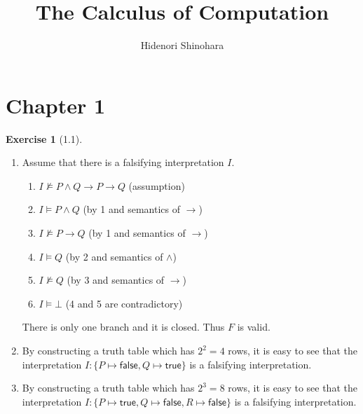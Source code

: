 \documentclass[12pt, psamsfonts]{amsart}
\theoremstyle{definition}
\newtheorem*{exer}{Exercise}
\theoremstyle{remark}
\numberwithin{equation}{subsection}
\begin{document}
\title{The Calculus of Computation}
\author{Hidenori Shinohara}

\maketitle

\section{Chapter 1}

\begin{exer}[1.1]
    $ $
    \begin{enumerate}[label=(\alph*)]
        \item
            Assume that there is a falsifying interpretation $I$.
            \begin{enumerate}[label=\arabic*.]
                \item %
                    $I \not\models P \land Q \rightarrow P \rightarrow Q$ (assumption)
                \item %
                    $I \models P \land Q$ (by 1 and semantics of $\rightarrow$)
                \item %
                    $I \not\models P \rightarrow Q$ (by 1 and semantics of $\rightarrow$)
                \item %
                    $I \models Q$ (by 2 and semantics of $\land$)
                \item %
                    $I \not\models Q$ (by 3 and semantics of $\rightarrow$)
                \item %
                    $I \models \bot$ (4 and 5 are contradictory)
            \end{enumerate}
            There is only one branch and it is closed.
            Thus $F$ is valid.
        \item
            By constructing a truth table which has $2^2 = 4$ rows, it is easy to see that the interpretation $I: \{ P \mapsto \textsf{false}, Q \mapsto \textsf{true} \}$ is a falsifying interpretation.
        \item
            By constructing a truth table which has $2^3 = 8$ rows, it is easy to see that the interpretation $I: \{ P \mapsto \textsf{true}, Q \mapsto \textsf{false}, R \mapsto \textsf{false} \}$ is a falsifying interpretation.
    \end{enumerate}
\end{exer}
\end{document}
